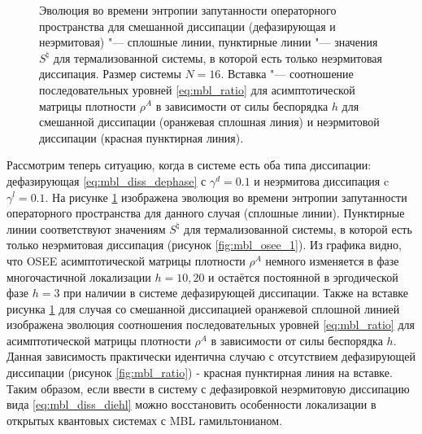 \begin{figure}[h]
	\caption[Эволюция во времени энтропии запутанности операторного пространства и зависимость соотношения последовательных уровней асимптотической матрицы плотности от силы беспорядка для смешанной диссипации (дефазирующая и неэрмитовая)]{
		Эволюция во времени энтропии запутанности операторного пространства для смешанной диссипации (дефазирующая и неэрмитовая) "--- сплошные линии, пунктирные линии "--- значения \(S^\natural\) для термализованной системы, в которой есть только неэрмитовая диссипация. Размер системы \(N=16\). Вставка "--- 
		соотношение последовательных уровней \cref{eq:mbl_ratio} для асимптотической матрицы плотности \(\rho^A\) в зависимости от силы беспорядка \(h\) для смешанной диссипации (оранжевая сплошная линия) и неэрмитовой диссипации (красная пунктирная линия).
	}
	\label{fig:mbl_both_diss}
\end{figure}

Рассмотрим теперь ситуацию, когда в системе есть оба типа диссипации: дефазирующая \cref{eq:mbl_diss_dephase} с \(\gamma^d = 0.1\) и неэрмитова диссипация c \(\gamma^l = 0.1\). 
На рисунке \cref{fig:mbl_both_diss} изображена эволюция во времени энтропии запутанности операторного пространства для данного случая (сплошные линии). Пунктирные линии соответствуют значениям \(S^\natural\) для термализованной системы, в которой есть только неэрмитовая диссипация (рисунок \cref{fig:mbl_osee_1}). 
Из графика видно, что OSEE асимптотической матрицы плотности \(\rho^A\) немного изменяется в фазе многочастичной локализации \(h=10, 20\) и остаётся постоянной в эргодической фазе \(h=3\) при наличии в системе дефазирующей диссипации. 
Также на вставке рисунка \cref{fig:mbl_both_diss} для случая со смешанной диссипацией оранжевой сплошной линией изображена эволюция соотношения последовательных уровней \cref{eq:mbl_ratio} для асимптотической матрицы плотности \(\rho^A\) в зависимости от силы беспорядка \(h\). 
Данная зависимость практически идентична случаю с отсутствием дефазирующей диссипации (рисунок \cref{fig:mbl_ratio}) - красная пунктирная линия на вставке.
Таким образом, если ввести в систему с дефазировкой неэрмитовую диссипацию вида \cref{eq:mbl_diss_diehl} можно восстановить особенности локализации в открытых квантовых системах с MBL гамильтонианом.

